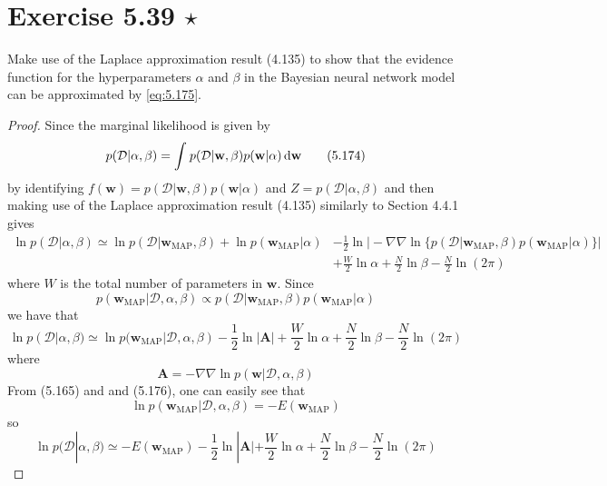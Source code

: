 \section*{Exercise 5.39 $\star$}
Make use of the Laplace approximation result (4.135) to show that the
evidence function for the hyperparameters $\alpha$ and $\beta$ in the Bayesian
neural network model can be approximated by \eqref{eq:5.175}.

\vspace{1em}

\begin{proof}
    Since the marginal likelihood is given by
    \begin{equation*}
        p(\mathcal{D} | \alpha, \beta)
        = \int_{}^{} p(\mathcal{D} | \mathbf{w}, \beta) p(\mathbf{w} | \alpha) \mathop{}\!\mathrm{d} \mathbf{w}
        \tag{5.174}\label{eq:5.174}
    \end{equation*}
    by identifying $f(\mathbf{w}) = p(\mathcal{D} | \mathbf{w}, \beta)p(\mathbf{w} | \alpha)$
    and $Z = p(\mathcal{D} | \alpha, \beta)$ and then making use of the Laplace approximation
    result (4.135) similarly to Section 4.4.1 gives
    \begin{align*}
        \ln p(\mathcal{D} | \alpha, \beta)
        \simeq \ln p(\mathcal{D} | \mathbf{w}_\text{MAP}, \beta) 
        + \ln p(\mathbf{w}_\text{MAP} | \alpha)
        &- \frac{1}{2} \ln\bigg|-\nabla \nabla \ln 
        \big\{p(\mathcal{D} | \mathbf{w}_\text{MAP}, \beta) p(\mathbf{w}_\text{MAP} | \alpha)\big\}
        \bigg|  \\
        &+ \frac{W}{2} \ln \alpha
        + \frac{N}{2} \ln \beta - \frac{N}{2} \ln(2\pi)
    \end{align*}
    where $W$ is the total number of parameters in $\mathbf{w}$. Since 
    \[
        p(\mathbf{w}_\text{MAP} | \mathcal{D}, \alpha, \beta) 
        \propto p(\mathcal{D} | \mathbf{w}_\text{MAP}, \beta)p(\mathbf{w}_\text{MAP} | \alpha)
    \] 
    we have that
    \[
        \ln p(\mathcal{D} | \alpha, \beta)
        \simeq \ln p(\mathbf{w}_\text{MAP} | \mathcal{D}, \alpha, \beta)
        - \frac{1}{2} \ln |\mathbf{A}|
        + \frac{W}{2} \ln \alpha
        + \frac{N}{2} \ln \beta - \frac{N}{2} \ln(2\pi)
    \] 
    where
    \begin{equation*}
        \mathbf{A} = -\nabla \nabla \ln p(\mathbf{w} | \mathcal{D}, \alpha, \beta)
        \tag{5.166}\label{eq:5.166}
    \end{equation*}
    From (5.165) and and (5.176), one can easily see that
    \[
        \ln p(\mathbf{w}_\text{MAP} | \mathcal{D}, \alpha, \beta)
        = -E(\mathbf{w}_\text{MAP})
    \]
    so
    \begin{equation*}
        \ln p(\mathcal{D} | \alpha, \beta)
        \simeq -E(\mathbf{w}_\text{MAP})
        - \frac{1}{2} \ln |\mathbf{A}|
        + \frac{W}{2} \ln \alpha
        + \frac{N}{2} \ln \beta - \frac{N}{2} \ln(2\pi)
        \tag{5.175}\label{eq:5.175}
    \end{equation*}
\end{proof}
